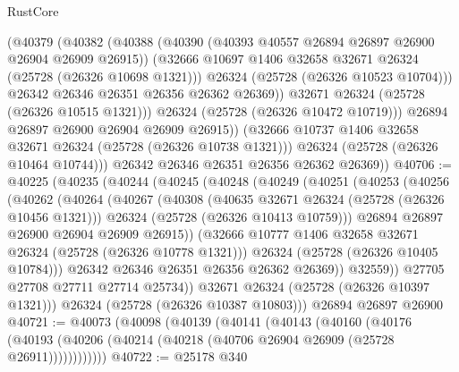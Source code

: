 \begin{lexlean}{RustCore}
\begin{coremodule}
                  (@40379
                    (@40382
                      (@40388
                        (@40390 (@40393 @40557 @26894 @26897 @26900 @26904 @26909 @26915))
                        (@32666 @10697 @1406 @32658 @32671 @26324 (@25728 (@26326 @10698 @1321)))
                        @26324
                        (@25728 (@26326 @10523 @10704)))
                      @26342
                      @26346
                      @26351
                      @26356
                      @26362
                      @26369))
                  @32671
                  @26324
                  (@25728 (@26326 @10515 @1321)))
                @26324
                (@25728 (@26326 @10472 @10719)))
              @26894
              @26897
              @26900
              @26904
              @26909
              @26915))
          (@32666 @10737 @1406 @32658 @32671 @26324 (@25728 (@26326 @10738 @1321)))
          @26324
          (@25728 (@26326 @10464 @10744)))
        @26342
        @26346
        @26351
        @26356
        @26362
        @26369))
@40706 := @40225
    (@40235
      (@40244
        (@40245
          (@40248
            (@40249
              (@40251
                (@40253
                  (@40256
                    (@40262
                      (@40264
                        (@40267
                          (@40308
                            (@40635 @32671 @26324 (@25728 (@26326 @10456 @1321)))
                            @26324
                            (@25728 (@26326 @10413 @10759)))
                          @26894
                          @26897
                          @26900
                          @26904
                          @26909
                          @26915))
                      (@32666 @10777 @1406 @32658 @32671 @26324 (@25728 (@26326 @10778 @1321)))
                      @26324
                      (@25728 (@26326 @10405 @10784)))
                    @26342
                    @26346
                    @26351
                    @26356
                    @26362
                    @26369))
                @32559))
            @27705
            @27708
            @27711
            @27714
            @25734))
        @32671
        @26324
        (@25728 (@26326 @10397 @1321)))
      @26324
      (@25728 (@26326 @10387 @10803)))
    @26894
    @26897
    @26900
@40721 := @40073
    (@40098
      (@40139
        (@40141
          (@40143
            (@40160
              (@40176
                (@40193 (@40206 (@40214 (@40218 (@40706 @26904 @26909 (@25728 @26911))))))))))))
@40722 := @25178 @340

\end{coremodule}
\end{lexlean}
